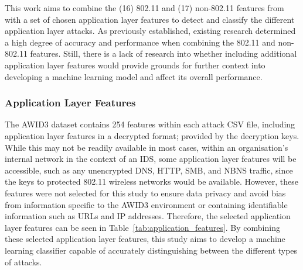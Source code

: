 This work aims to combine the (16) 802.11 and (17) non-802.11 features from \textcite{s22155633} with a set of chosen application layer features to detect and classify the different application layer attacks. As previously established, existing research determined a high degree of accuracy and performance when combining the 802.11 and non-802.11 features. Still, there is a lack of research into whether including additional application layer features would provide grounds for further context into developing a machine learning model and affect its overall performance.

\subsubsection{Application Layer Features}

The AWID3 dataset contains 254 features within each attack CSV file, including application layer features in a decrypted format; provided by the decryption keys. While this may not be readily available in most cases, within an organisation's internal network in the context of an IDS, some application layer features will be accessible, such as any unencrypted DNS, HTTP, SMB, and NBNS traffic, since the keys to protected 802.11 wireless networks would be available. However, these features were not selected for this study to ensure data privacy and avoid bias from information specific to the AWID3 environment or containing identifiable information such as URLs and IP addresses. Therefore, the selected application layer features can be seen in Table~\ref{tab:application_features}. By combining these selected application layer features, this study aims to develop a machine learning classifier capable of accurately distinguishing between the different types of attacks.

